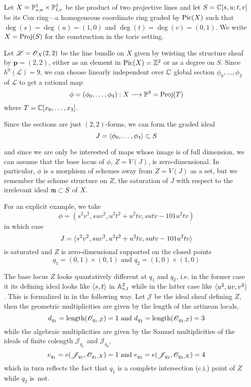 \documentclass[fleqn,reqno]{amsart}
\begin{document}
\begin{example}[$\mt{ex203}$]
\label{ex203}
Let $X=\PP^1_{s,u}\times\PP^1_{t,v}$ be the product of two projective lines and let $S=\CC[s,u;t,v]$
be its Cox ring---a homogeneous coordinate ring graded by $\Pic(X)$ such that $\deg(s)=\deg(u)=(1,0)$
and $\deg(t)=\deg(v)=(0,1)$.
We write $X=\Proj(S)$ for the construction in the toric setting.

Let $\mathscr{L}=\O_X(2,2)$ be the line bundle on $X$ given by twisting the structure sheaf by
$\mathbf p=(2,2)$, either as an element in $\Pic(X)=\ZZ^2$ or as a degree on $S$.
Since $h^0(\mathscr{L})=9$, we can choose  linearly independent over $\CC$
global section $\phi_0,\ldots,\phi_3$ of $\mathscr{L}$ to get a rational map
\[
	\phi=(\phi_0,\ldots,\phi_3):X\To\PP^3=\Proj(T)
\]
where $T=\CC[x_0,\ldots,x_3]$.

Since the sections are just $(2,2)$-forms, we can form the graded ideal
\[
	J=\la \phi_0,\ldots,\phi_3\ra\se S
\]

and since we are only be interested of maps whose image is of full dimension,
we can assume that the base locus of $\phi$, $Z=V(J)$, is zero-dimensional.
In particular, $\phi$ is a morphism of schemes away from $Z=V(J)$ as a set,
but we remember the scheme structure on $Z$,
the saturation of $J$ with respect to the irrelevant ideal $\m\se S$ of $X$.

For an explicit example, we take
\[
	\phi=(s^{2} v^{2},s u v^{2},u^{2} t^{2}+u^{2} t v,s u t v-101 u^{2}t v)
\]
in which case
\[
	J=\la s^{2} v^{2},s u v^{2},u^{2} t^{2}+u^{2} t v,s u t v-101 u^{2}t v\ra
\]
is saturated and $Z$ is zero-dimensional supported on the closed points
\[
	q_1=(0,1)\times(0,1) \text{ and } q_2=(1,0)\times(1,0)
\]

The base locus $Z$ looks quantatively different at $q_1$ and $q_2$, i.e.
in the former case it its defining ideal looks like $\la s,t\ra$ in $\AA^2_{s,t}$
while in the latter case like $\la u^2,uv,v^2\ra$.
This is formalized in in the following way.
Let $\mathscr{J}$ be the ideal sheaf defining $Z$,
then the geometric multiplicities are given by the length of the artinean locals,
\[
	d_{q_1}=\length(\O_{q_1,Z})=1 \text{ and } d_{q_2}=\length(\O_{q_2,Z})=3
\]
while the algebraic multiplicities are given by the Samuel multiplicities
of the ideals of finite colength $\mathscr{J}_{q_1}$ and $\mathscr{J}_{q_2}$,
\[
	e_{q_1}=e(\mathscr{J}_{q_1},\O_{q_1,X})=1 \text{ and } e_{q_2}=e(\mathscr{J}_{q_2},\O_{q_2,X})=4
\]
which in turn reflects the fact that $q_1$ is a complete intersection (c.i.) point of $Z$
while $q_2$ is~not.


\end{example}
\end{document}
